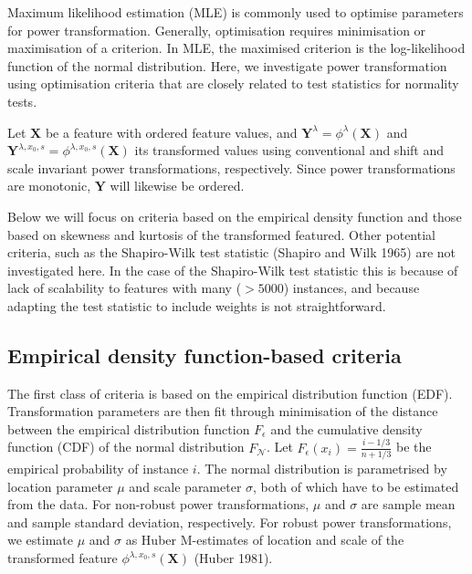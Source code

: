 \documentclass[
  a4paper,
]{article}
\begin{document}
Maximum likelihood estimation (MLE) is commonly used to optimise
parameters for power transformation. Generally, optimisation requires
minimisation or maximisation of a criterion. In MLE, the maximised
criterion is the log-likelihood function of the normal distribution.
Here, we investigate power transformation using optimisation criteria
that are closely related to test statistics for normality tests.

Let \(\mathbf{X}\) be a feature with ordered feature values, and
\(\mathbf{Y}^\lambda =\phi^{\lambda} \left(\mathbf{X} \right)\) and
\(\mathbf{Y}^{\lambda, x_0, s} =\phi^{\lambda, x_0, s} \left(\mathbf{X} \right)\)
its transformed values using conventional and shift and scale invariant
power transformations, respectively. Since power transformations are
monotonic, \(\mathbf{Y}\) will likewise be ordered.

Below we will focus on criteria based on the empirical density function
and those based on skewness and kurtosis of the transformed featured.
Other potential criteria, such as the Shapiro-Wilk test statistic
(Shapiro and Wilk 1965) are not investigated here. In the case of the
Shapiro-Wilk test statistic this is because of lack of scalability to
features with many (\(> 5000\)) instances, and because adapting the test
statistic to include weights is not straightforward.

\subsection{Empirical density function-based
criteria}\label{empirical-density-function-based-criteria}

The first class of criteria is based on the empirical distribution
function (EDF). Transformation parameters are then fit through
minimisation of the distance between the empirical distribution function
\(F_{\epsilon}\) and the cumulative density function (CDF) of the normal
distribution \(F_{\mathcal{N}}\). Let
\(F_{\epsilon}\left(x_i \right) = \frac{i - 1/3}{n + 1/3}\) be the
empirical probability of instance \(i\). The normal distribution is
parametrised by location parameter \(\mu\) and scale parameter
\(\sigma\), both of which have to be estimated from the data. For
non-robust power transformations, \(\mu\) and \(\sigma\) are sample mean
and sample standard deviation, respectively. For robust power
transformations, we estimate \(\mu\) and \(\sigma\) as Huber M-estimates
of location and scale of the transformed feature
\(\phi^{\lambda, x_0, s} (\mathbf{X})\) (Huber 1981).
\end{document}

